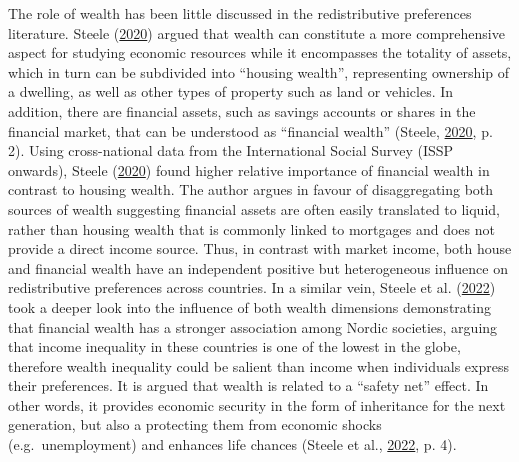 \documentclass[
  12pt,
]{book}
\begin{document}
The role of wealth has been little discussed in the redistributive preferences literature. Steele (\protect\hyperlink{ref-steele_wealth_2020}{2020}) argued that wealth can constitute a more comprehensive aspect for studying economic resources while it encompasses the totality of assets, which in turn can be subdivided into ``housing wealth'', representing ownership of a dwelling, as well as other types of property such as land or vehicles. In addition, there are financial assets, such as savings accounts or shares in the financial market, that can be understood as ``financial wealth'' (Steele, \protect\hyperlink{ref-steele_wealth_2020}{2020}, p. 2). Using cross-national data from the International Social Survey (ISSP onwards), Steele (\protect\hyperlink{ref-steele_wealth_2020}{2020}) found higher relative importance of financial wealth in contrast to housing wealth. The author argues in favour of disaggregating both sources of wealth suggesting financial assets are often easily translated to liquid, rather than housing wealth that is commonly linked to mortgages and does not provide a direct income source. Thus, in contrast with market income, both house and financial wealth have an independent positive but heterogeneous influence on redistributive preferences across countries. In a similar vein, Steele et al. (\protect\hyperlink{ref-steele_wealth_2022}{2022}) took a deeper look into the influence of both wealth dimensions demonstrating that financial wealth has a stronger association among Nordic societies, arguing that income inequality in these countries is one of the lowest in the globe, therefore wealth inequality could be salient than income when individuals express their preferences. It is argued that wealth is related to a ``safety net'' effect. In other words, it provides economic security in the form of inheritance for the next generation, but also a protecting them from economic shocks (e.g.~unemployment) and enhances life chances (Steele et al., \protect\hyperlink{ref-steele_wealth_2022}{2022}, p. 4).
\end{document}
